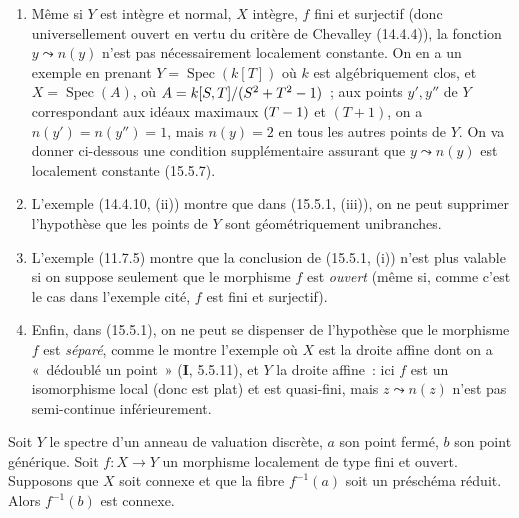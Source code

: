 \begin{remarks}[15.5.5]
\label{IV.15.5.5-fr}
\begin{enumerate}[label=\emph{(\roman*)}]
  \item Même si $Y$ est intègre et normal, $X$ intègre, $f$ fini et surjectif (donc universellement ouvert en vertu du critère de Chevalley (14.4.4)), la fonction $y\leadsto n(y)$ n'est pas nécessairement localement constante. On en a un exemple en prenant $Y=\operatorname{Spec}(k[T])$ où $k$ est algébriquement clos, et $X=\operatorname{Spec}(A)$, où $A=k[S,T]/(S^2+T^2- 1)$~; aux points $y',y''$ de $Y$ correspondant aux idéaux maximaux $(T- 1)$ et $(T+1)$, on a $n(y')=n(y'')=1$, mais $n(y)=2$ en tous les autres points de $Y$. On va donner ci-dessous une condition supplémentaire assurant que $y\leadsto n(y)$ est localement constante (15.5.7).
  \item L'exemple (14.4.10, (ii)) montre que dans (15.5.1, (iii)), on ne peut supprimer l'hypothèse que les points de $Y$ sont géométriquement unibranches.
  \item L'exemple (11.7.5) montre que la conclusion de (15.5.1, (i)) n'est plus valable si on suppose seulement que le morphisme $f$ est \emph{ouvert} (même si, comme c'est le cas dans l'exemple cité, $f$ est fini et surjectif).
  \item Enfin, dans (15.5.1), on ne peut se dispenser de l'hypothèse que le morphisme $f$ est \emph{séparé}, comme le montre l'exemple où $X$ est la droite affine dont on a «~dédoublé un point~» (\textbf{I}, 5.5.11), et $Y$ la droite affine~: ici $f$ est un isomorphisme local (donc est plat) et est quasi-fini, mais $z\leadsto n(z)$ n'est pas semi-continue inférieurement.
\end{enumerate}
\end{remarks}

\begin{lemma}[15.5.6]
\label{IV.15.5.6-fr}
Soit $Y$ le spectre d'un anneau de valuation discrète, $a$ son point fermé, $b$ son point générique. Soit $f:X\to Y$ un morphisme localement de type fini et ouvert. Supposons que $X$ soit connexe et que la fibre $f^{-1}(a)$ soit un préschéma réduit. Alors $f^{-1}(b)$ est connexe.
\end{lemma}

